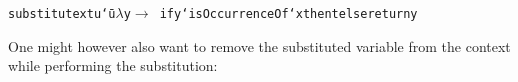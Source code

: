 \documentclass[9pt,authoryear]{sigplanconf}
\begin{document}
{{}\vphantom{$\{$}}\texttt{substitute}\texttt{\mbox{\hspace{0.50em}}}\texttt{x}\texttt{\mbox{\hspace{0.50em}}}\texttt{t}\texttt{\mbox{\hspace{0.50em}}}\texttt{u}\texttt{\mbox{\hspace{0.50em}}}\texttt{{\char `\=}}\texttt{\mbox{\hspace{0.50em}}}\texttt{u}\texttt{\mbox{\hspace{0.50em}}}\texttt{\makebox[1.22ex][c]{\textgreater{}}}\texttt{\mbox{\hspace{0.50em}}}\texttt{$ \lambda $}\texttt{\mbox{\hspace{0.50em}}}\texttt{y}\texttt{\mbox{\hspace{0.50em}}}\texttt{$ \rightarrow $}\texttt{{\nopagebreak \newline%
}\vphantom{$\{$}}\texttt{\mbox{\hspace{0.50em}}}\texttt{\mbox{\hspace{0.50em}}}\texttt{\mbox{\hspace{0.50em}}}\texttt{\mbox{\hspace{0.50em}}}\texttt{\mbox{\hspace{0.50em}}}\texttt{if}\texttt{\mbox{\hspace{0.50em}}}\texttt{y}\texttt{\mbox{\hspace{0.50em}}}\texttt{{`}isOccurrenceOf{`}}\texttt{\mbox{\hspace{0.50em}}}\texttt{x}\texttt{\mbox{\hspace{0.50em}}}\texttt{then}\texttt{\mbox{\hspace{0.50em}}}\texttt{t}\texttt{\mbox{\hspace{0.50em}}}\texttt{else}\texttt{\mbox{\hspace{0.50em}}}\texttt{return}\texttt{\mbox{\hspace{0.50em}}}\texttt{y}\texttt{{\nopagebreak \newline%
}\vphantom{$\{$}}%


%
One might however also want to remove the substituted
    variable from the context while performing the substitution{:}%


{\nopagebreak }
\end{document}
